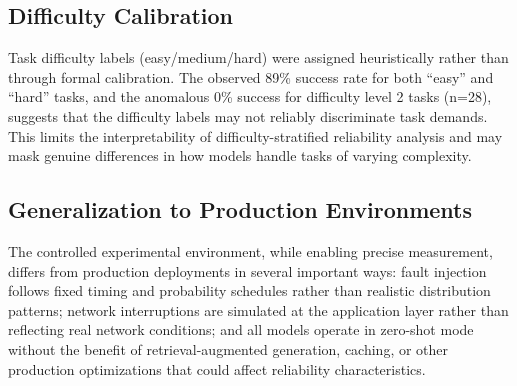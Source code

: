 \subsection{Difficulty Calibration}

Task difficulty labels (easy/medium/hard) were assigned heuristically rather than through formal calibration. The observed 89\% success rate for both ``easy'' and ``hard'' tasks, and the anomalous 0\% success for difficulty level 2 tasks (n=28), suggests that the difficulty labels may not reliably discriminate task demands. This limits the interpretability of difficulty-stratified reliability analysis and may mask genuine differences in how models handle tasks of varying complexity.

\subsection{Generalization to Production Environments}

The controlled experimental environment, while enabling precise measurement, differs from production deployments in several important ways: fault injection follows fixed timing and probability schedules rather than realistic distribution patterns; network interruptions are simulated at the application layer rather than reflecting real network conditions; and all models operate in zero-shot mode without the benefit of retrieval-augmented generation, caching, or other production optimizations that could affect reliability characteristics.
